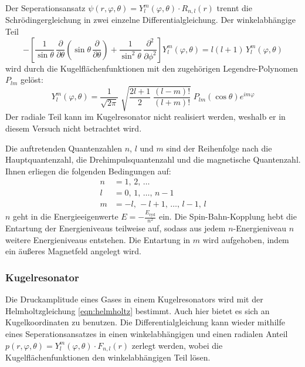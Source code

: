             Der Seperationsansatz $\psi(r,\varphi,\theta) = Y^m_l(\varphi,\theta) \cdot R_{n,l}(r)$ trennt die Schrödingergleichung in zwei einzelne Differentialgleichung. Der winkelabhängige Teil
            \begin{equation*}
                -\left[\frac{1}{\sin \theta} \, \frac{\partial}{\partial \theta} \left(\sin \theta \, \frac{\partial}{\partial \theta}\right) + \frac{1}{\sin^2 \theta} \, \frac{\partial^2}{\partial \phi^2}\right] Y^m_l(\varphi,\theta) = l(l+1) \, Y^m_l(\varphi,\theta)
            \end{equation*}
            wird durch die Kugelflächenfunktionen mit den zugehörigen Legendre-Polynomen $P_{lm}$ gelöst:
            \begin{equation}
                Y^m_l(\varphi,\theta) = \frac{1}{\sqrt{2\pi}} \; \sqrt{\frac{2l+1}{2} \; \frac{(l-m)!}{(l+m)!}} \; P_{lm}\left(\cos \theta\right) e^{i m \varphi}
            \end{equation}
            Der radiale Teil kann im Kugelresonator nicht realisiert werden, weshalb er in diesem Versuch nicht betrachtet wird.

            Die auftretenden Quantenzahlen $n$, $l$ und $m$ sind der Reihenfolge nach die Hauptquantenzahl, die Drehimpulsquantenzahl und die magnetische Quantenzahl. Ihnen erliegen die folgenden Bedingungen auf:
            \begin{align*}
                n &= 1, \, 2, \, \ldots  \\
                l &= 0, \, 1, \, \ldots, \, n-1 \\
                m &= -l, \, -l+1, \, \ldots, \, l-1, \, l
            \end{align*}
            $n$ geht in die Energieeigenwerte $E = -\frac{E_{\text{ryd}}}{n^2}$ ein. Die Spin-Bahn-Kopplung hebt die Entartung der Energieniveaus teilweise auf, sodass aus jedem $n$-Energieniveau $n$ weitere Energieniveaus entstehen. Die Entartung in $m$ wird aufgehoben, indem ein äußeres Magnetfeld angelegt wird.

        \subsubsection*{Kugelresonator}
            Die Druckamplitude eines Gases in einem Kugelresonators wird mit der Helmholtzgleichung \eqref{eqn:helmholtz} bestimmt.
            Auch hier bietet es sich an Kugelkoordinaten zu benutzen.
            Die Differentialgleichung kann wieder mithilfe eines Seperationsansatzes in einen winkelabhängigen und einen radialen Anteil $p(r,\varphi,\theta) = Y^m_l(\varphi,\theta) \cdot F_{n,l}(r)$ zerlegt werden, wobei die Kugelflächenfunktionen den winkelabhängigen Teil lösen.

